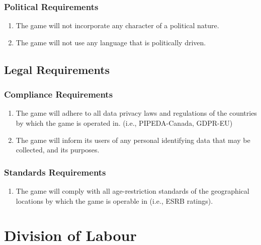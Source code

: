 \documentclass[]{article}
\begin{document}
\subsubsection{Political Requirements}
\label{ssub:political_requirements}
\begin{enumerate}[{CP}1. ]
	\item The game will not incorporate any character of a political nature.
	\item The game will not use any language that is politically driven.
\end{enumerate}


\subsection{Legal Requirements}
\label{sub:legal_requirements}

\subsubsection{Compliance Requirements}
\label{ssub:compliance_requirements}
\begin{enumerate}[{LR}1. ]
    \item The game will adhere to all data privacy laws and regulations of the countries by which the game is operated in. (i.e., PIPEDA-Canada, GDPR-EU) ~\cite{PIPEDA-CA} ~\cite{GDPR-EU}
	\item The game will inform its users of any personal identifying data that may be collected, and its purposes.
\end{enumerate}

\subsubsection{Standards Requirements}
\label{ssub:standards_requirements}
\begin{enumerate}[{LR}1. ]
	\item The game will comply with all age-restriction standards of the geographical locations by which the game is operable in (i.e., ESRB ratings). 
\end{enumerate}


\newpage
\appendix
\section{Division of Labour}
\label{sec:division_of_labour}
\end{document}
